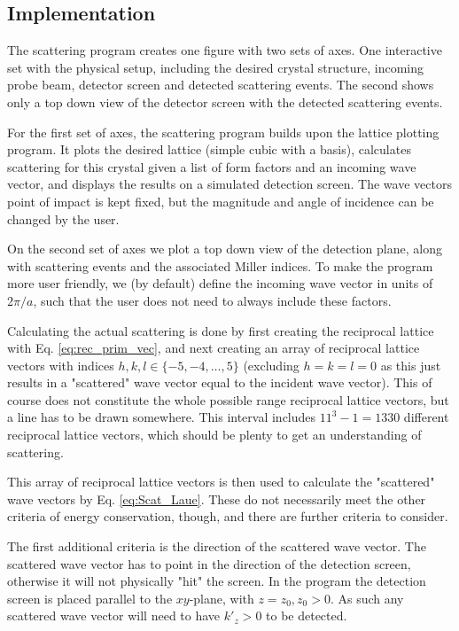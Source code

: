 \documentclass[main.tex]{subfiles}
\begin{document}
	\subsection{Implementation}	
	The scattering program creates one figure with two sets of axes. One interactive set with the physical setup, including the desired crystal structure, incoming probe beam, detector screen and detected scattering events. The second shows only a top down view of the detector screen with the detected scattering events.
	
	For the first set of axes, the scattering program builds upon the lattice plotting program. It plots the desired lattice (simple cubic with a basis), calculates scattering for this crystal given a list of form factors and an incoming wave vector, and displays the results on a simulated detection screen. The wave vectors point of impact is kept fixed, but the magnitude and angle of incidence can be changed by the user.
	
	On the second set of axes we plot a top down view of the detection plane, along with scattering events and the associated Miller indices. To make the program more user friendly, we (by default) define the incoming wave vector in units of $ 2\pi/a $, such that the user does not need to always include these factors.
	
	Calculating the actual scattering is done by first creating the reciprocal lattice with Eq. \eqref{eq:rec_prim_vec}, and next creating an array of reciprocal lattice vectors with indices $ h,k,l \in \{-5, -4, \dots, 5\} $ (excluding $ h=k=l=0 $ as this just results in a "scattered" wave vector equal to the incident wave vector). This of course does not constitute the whole possible range reciprocal lattice vectors, but a line has to be drawn somewhere. This interval includes $ 11^3 - 1 = 1330$ different reciprocal lattice vectors, which should be plenty to get an understanding of scattering.
	
	This array of reciprocal lattice vectors is then used to calculate the "scattered" wave vectors by Eq. \eqref{eq:Scat_Laue}. These do not necessarily meet the other criteria of energy conservation, though, and there are further criteria to consider.
	
	The first additional criteria is the direction of the scattered wave vector. The scattered wave vector has to point in the direction of the detection screen, otherwise it will not physically "hit" the screen. In the program the detection screen is placed parallel to the $ xy $-plane, with $ z=z_0, z_0 > 0 $. As such any scattered wave vector will need to have $ k'_z > 0 $ to be detected.
	
\end{document}
